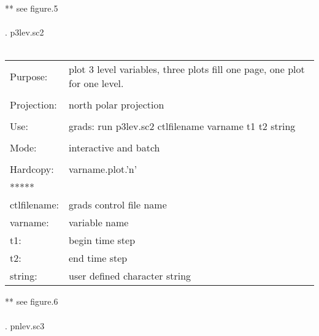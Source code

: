 ** see figure.5
\\ 
\\
. p3lev.sc2 \\ \\
\begin{tabular}{ll}
Purpose:     &  plot 3 level variables, three plots fill one page, one plot for one level.\\
\\
Projection:  &  north polar projection                                                \\
\\
Use:         &  grads: run p3lev.sc2 ctlfilename varname t1 t2  string                \\
\\
Mode:        &  interactive and batch                                                 \\
\\
Hardcopy:    &  varname.plot.'n'                                                      \\
*****  \\
ctlfilename: &  grads control file name \\
varname:     &  variable name           \\
t1:       &  begin time step            \\
t2:       &  end time step              \\
string:   &   user defined character string  
\end{tabular}
** see figure.6
\\ 
\\
\newpage
{}. pnlev.sc3 \\ \\
